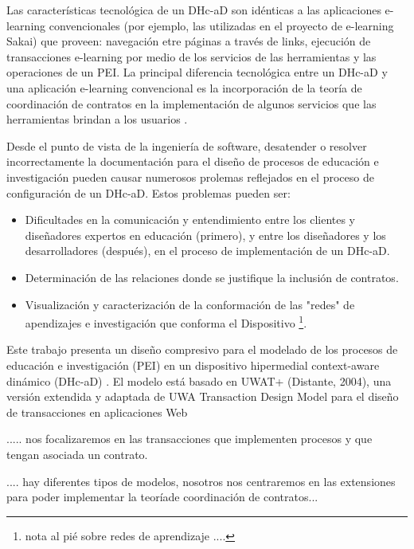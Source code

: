 \documentclass{llncs}
\begin{document}
Las características tecnológica de un DHc-aD son idénticas a las aplicaciones e-learning convencionales (por ejemplo, las utilizadas en el proyecto de e-learning Sakai) que proveen:  navegación etre páginas a través de links, ejecución de transacciones e-learning por medio de los servicios de las herramientas y las operaciones de un PEI. La principal diferencia tecnológica entre un DHc-aD y una aplicación e-learning convencional es la incorporación de la teoría de coordinación de contratos \cite{fiadeiro, sartorio} en la implementación de algunos servicios que las herramientas brindan a los usuarios \cite{libro}.

Desde el punto de vista de la ingeniería de software, desatender o resolver incorrectamente la documentación para el diseño de procesos de educación e investigación pueden causar numerosos prolemas reflejados en el proceso de configuración  de un DHc-aD. Estos problemas pueden ser:


\begin{itemize}
	\item Dificultades en la comunicación y entendimiento entre los clientes y diseñadores expertos en educación (primero), y entre los diseñadores y los desarrolladores (después), en el proceso de implementación de un DHc-aD.

	\item Determinación de las relaciones donde se justifique la inclusión de contratos.
	
	\item Visualización y caracterización de la conformación de las "redes" de apendizajes e investigación que conforma el Dispositivo \footnote{nota al pié sobre redes de aprendizaje ....}.
\end{itemize}



Este trabajo presenta un diseño compresivo para el modelado de los procesos de educación e investigación (PEI) en un dispositivo hipermedial context-aware dinámico (DHc-aD) \cite{libro}. El modelo está basado en UWAT+ (Distante, 2004), una versión extendida y adaptada de UWA Transaction Design Model para el diseño de transacciones en aplicaciones Web  


..... nos focalizaremos en las transacciones que implementen procesos y que tengan asociada un contrato.

.... hay diferentes tipos de modelos, nosotros nos centraremos en las extensiones para poder implementar la teoríade coordinación de contratos...
\end{document}
